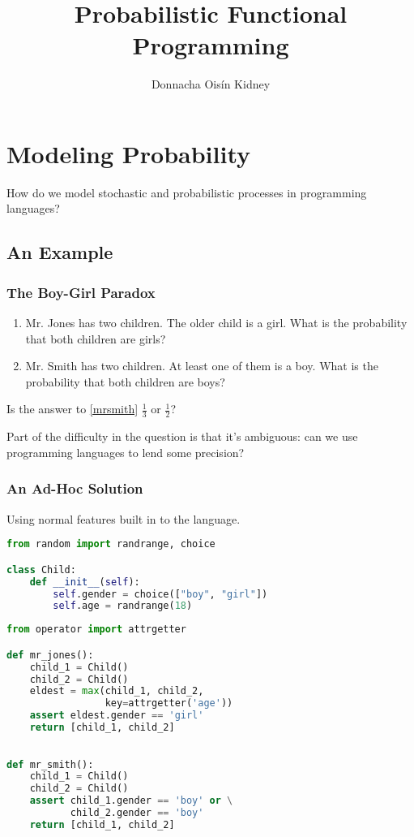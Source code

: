 \documentclass[usenames,dvipsnames]{beamer}
\title{Probabilistic Functional Programming}
\author{Donnacha Oisín Kidney}
\begin{document}
\frame{\titlepage}
\begin{frame}
  \begin{multicols}{2}
    \tableofcontents
  \end{multicols}
\end{frame}
\section{Modeling Probability}
\begin{frame}
  How do we model stochastic and probabilistic processes in programming
  languages?
\end{frame}
\subsection{An Example}
\begin{frame}
  \frametitle{The Boy-Girl Paradox}
  \begin{enumerate}
    \item Mr. Jones has two children. The older child is a girl. What is the
      probability that both children are girls?
    \item \label{mrsmith} Mr. Smith has two children. At least one of them is a
      boy. What is the probability that both children are boys?
  \end{enumerate}
  \pause
  Is the answer to \ref{mrsmith} $\frac{1}{3}$ or $\frac{1}{2}$?
  \pause

  Part of the difficulty in the question is that it's ambiguous: can we use
  programming languages to lend some precision?
\end{frame}
\begin{frame}
  \frametitle{An Ad-Hoc Solution}
  Using normal features built in to the language.
  \begin{lstlisting}[language=Python]
from random import randrange, choice

class Child:
    def __init__(self):
        self.gender = choice(["boy", "girl"])
        self.age = randrange(18)
  \end{lstlisting}
  \begin{lstlisting}[language=Python]
from operator import attrgetter

def mr_jones():
    child_1 = Child()
    child_2 = Child()
    eldest = max(child_1, child_2,
                 key=attrgetter('age'))
    assert eldest.gender == 'girl'
    return [child_1, child_2]
  \end{lstlisting}
  \begin{lstlisting}[language=Python]

def mr_smith():
    child_1 = Child()
    child_2 = Child()
    assert child_1.gender == 'boy' or \
           child_2.gender == 'boy'
    return [child_1, child_2]
  \end{lstlisting}
\end{frame}
\end{document}

